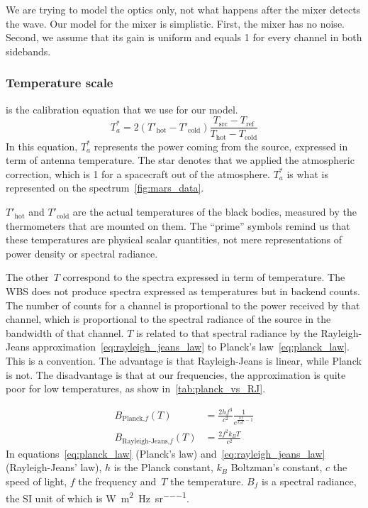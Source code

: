 We are trying to model the optics only, not what happens after the mixer detects the wave.
Our model for the mixer is simplistic.
First, the mixer has no noise.
Second, we assume that its gain is uniform and equals 1 for every channel in both sidebands.

\subsubsection{Temperature scale}
\label{sec:the_temperature_scale}

 is the calibration equation that we use for our model.
\begin{equation}
    T_a^* =
    2
    (T'_\text{hot} - T'_\text{cold})
    \frac{
        T_\text{src} - T_\text{ref}
    }{
        T_\text{hot} - T_\text{cold}
    }
    \label{eq:calibration_model}
\end{equation}
In this equation, $T_a^*$ represents the power coming from the source, expressed in term of antenna temperature.
The star denotes that we applied the atmospheric correction, which is 1 for a spacecraft out of the atmosphere.
$T_a^*$ is what is represented on the spectrum~\cref{fig:mars_data}.

$T'_\text{hot}$ and $T'_\text{cold}$ are the actual temperatures of the black bodies, measured by the thermometers that are mounted on them.
The ``prime'' symbols remind us that these temperatures are physical scalar quantities, not mere representations of power density or spectral radiance.

The other~$T$ correspond to the spectra expressed in term of temperature.
The WBS does not produce spectra expressed as temperatures but in backend counts.
The number of counts for a channel is proportional to the power received by that channel, which is proportional to the spectral radiance of the source in the bandwidth of that channel.
$T$ is related to that spectral radiance by
the Rayleigh-Jeans approximation~\eqref{eq:rayleigh_jeans_law}
to Planck's law~\eqref{eq:planck_law}.
This is a convention.
The advantage is that Rayleigh-Jeans is linear, while Planck is not.
The disadvantage is that at our frequencies, the approximation is quite poor for low temperatures, as show in~\cref{tab:planck_vs_RJ}.

\begin{align}
    B_{\text{Planck,}f}(T)
    &=
    \frac{2 h f^3}{c^2} \frac{1}{e^{\frac{h f}{k_B T} - 1}}
    \label{eq:planck_law}
    \\
    B_{\text{Rayleigh-Jeans,}f}(T)
    &=
    \frac{2 f^2 k_B T}{c^2}
    \label{eq:rayleigh_jeans_law}
\end{align}
In equations~\eqref{eq:planck_law} (Planck's law)
and~\eqref{eq:rayleigh_jeans_law} (Rayleigh-Jeans' law),
$h$ is the Planck constant, $k_B$ Boltzman's constant, $c$ the speed of light, $f$ the frequency and~$T$ the temperature.
$B_f$ is a spectral radiance, the SI unit of which is \si{\watt \per \meter \squared \per \hertz \per \steradian}.

